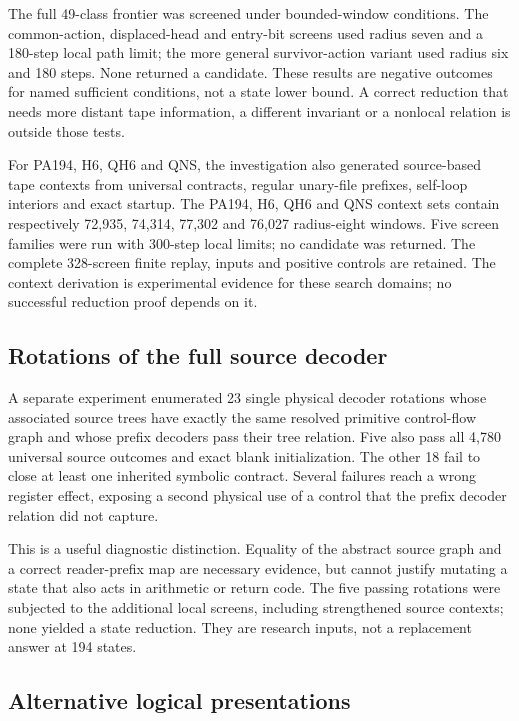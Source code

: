 \documentclass[11pt,letterpaper]{article}
\begin{document}
The full 49-class frontier was screened under bounded-window conditions.
The common-action, displaced-head and entry-bit screens used radius seven
and a 180-step local path limit; the more general survivor-action variant
used radius six and 180 steps. None returned a candidate. These results
are negative outcomes for named sufficient conditions, not a state lower
bound. A correct reduction that needs more distant tape information,
a different invariant or a nonlocal relation is outside those tests.

For PA194, H6, QH6 and QNS, the investigation also generated source-based tape
contexts from universal contracts, regular unary-file prefixes, self-loop
interiors and exact startup. The PA194, H6, QH6 and QNS context sets contain respectively
72,935, 74,314, 77,302 and 76,027 radius-eight windows. Five screen families were
run with 300-step local limits; no candidate was returned. The complete 328-screen finite replay, inputs and
positive controls are retained. The context derivation is experimental evidence
for these search domains; no successful reduction proof depends on it.

\subsection{Rotations of the full source decoder}

A separate experiment enumerated 23 single physical decoder rotations
whose associated source trees have exactly the same resolved primitive
control-flow graph and whose prefix decoders pass their tree relation.
Five also pass all 4,780 universal source outcomes and exact blank
initialization. The other 18 fail to close at least one inherited symbolic
contract. Several failures reach a wrong register effect, exposing a
second physical use of a control that the prefix decoder relation did not
capture.

This is a useful diagnostic distinction. Equality of the abstract source
graph and a correct reader-prefix map are necessary evidence, but cannot
justify mutating a state that also acts in arithmetic or return code.
The five passing rotations were subjected to the additional local screens,
including strengthened source contexts; none yielded a state reduction.
They are research inputs, not a replacement answer at 194 states.

\subsection{Alternative logical presentations}
\end{document}
